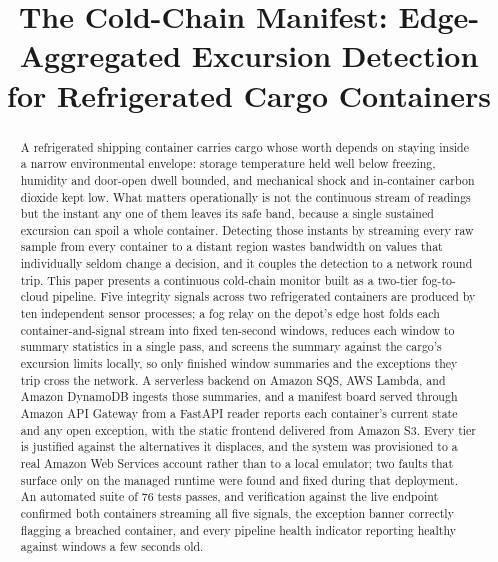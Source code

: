 \documentclass[conference]{IEEEtran}
\begin{document}
\title{The Cold-Chain Manifest: Edge-Aggregated Excursion Detection for Refrigerated Cargo Containers}

\author{
}

\maketitle

\begin{abstract}
A refrigerated shipping container carries cargo whose worth depends on staying inside a narrow environmental envelope: storage temperature held well below freezing, humidity and door-open dwell bounded, and mechanical shock and in-container carbon dioxide kept low. What matters operationally is not the continuous stream of readings but the instant any one of them leaves its safe band, because a single sustained excursion can spoil a whole container. Detecting those instants by streaming every raw sample from every container to a distant region wastes bandwidth on values that individually seldom change a decision, and it couples the detection to a network round trip. This paper presents a continuous cold-chain monitor built as a two-tier fog-to-cloud pipeline. Five integrity signals across two refrigerated containers are produced by ten independent sensor processes; a fog relay on the depot's edge host folds each container-and-signal stream into fixed ten-second windows, reduces each window to summary statistics in a single pass, and screens the summary against the cargo's excursion limits locally, so only finished window summaries and the exceptions they trip cross the network. A serverless backend on Amazon SQS, AWS Lambda, and Amazon DynamoDB ingests those summaries, and a manifest board served through Amazon API Gateway from a FastAPI reader reports each container's current state and any open exception, with the static frontend delivered from Amazon S3. Every tier is justified against the alternatives it displaces, and the system was provisioned to a real Amazon Web Services account rather than to a local emulator; two faults that surface only on the managed runtime were found and fixed during that deployment. An automated suite of 76 tests passes, and verification against the live endpoint confirmed both containers streaming all five signals, the exception banner correctly flagging a breached container, and every pipeline health indicator reporting healthy against windows a few seconds old.
\end{abstract}
\end{document}
